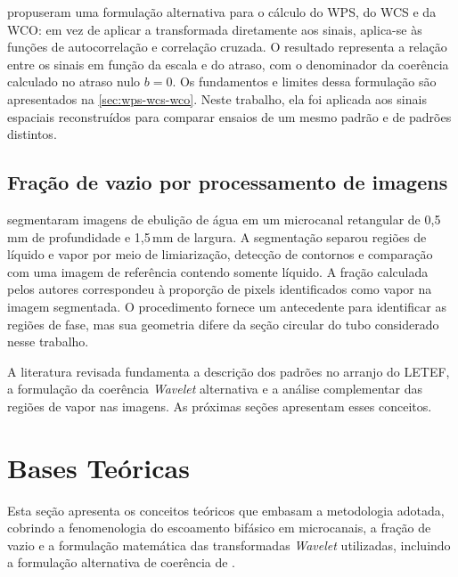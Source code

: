  propuseram uma formulação alternativa para o cálculo do WPS, do
WCS e da WCO: em vez de aplicar a transformada diretamente aos sinais, aplica-se às
funções de autocorrelação e correlação cruzada. O resultado representa a relação
entre os sinais em função da escala e do atraso, com o denominador da coerência
calculado no atraso nulo $b = 0$. Os fundamentos e limites dessa formulação são apresentados
na \autoref{sec:wps-wcs-wco}. Neste trabalho, ela foi aplicada aos sinais espaciais
reconstruídos para comparar ensaios de um mesmo padrão e de padrões distintos.

\subsection{Fração de vazio por processamento de imagens}\label{sec:rev-fracao-vazio}

 segmentaram imagens de ebulição de água em um
microcanal retangular de 0{,}5\,mm de profundidade e 1{,}5\,mm de largura.
A segmentação separou regiões de líquido e vapor por meio de limiarização,
detecção de contornos e comparação com uma imagem de referência contendo
somente líquido. A fração calculada pelos autores correspondeu à proporção
de pixels identificados como vapor na imagem segmentada. O procedimento
fornece um antecedente para identificar as regiões de fase, mas sua geometria
difere da seção circular do tubo considerado nesse trabalho.

A literatura revisada fundamenta a descrição dos padrões no arranjo do LETEF,
a formulação da coerência \textit{Wavelet} alternativa e a análise complementar
das regiões de vapor nas imagens. As próximas seções apresentam esses conceitos.

\section{Bases Teóricas}\label{sec:bases}

Esta seção apresenta os conceitos teóricos que embasam a metodologia adotada, cobrindo
a fenomenologia do escoamento bifásico em microcanais, a fração de vazio e a formulação matemática das
transformadas \textit{Wavelet} utilizadas, incluindo a formulação alternativa de coerência
de .

